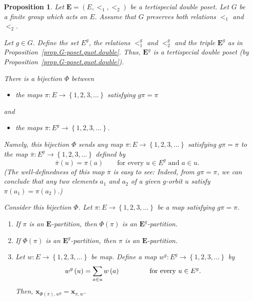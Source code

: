\documentclass[12pt]{article}
\theoremstyle{plain}
\newtheorem{proposition}[theorem]{Proposition}
\theoremstyle{definition}
\theoremstyle{remark}
\let\sumnonlimits\sum
\renewcommand{\sum}{\sumnonlimits\limits}
\newcommand{\xx}{{\mathbf{x}}}
\newcommand{\EE}{{\mathbf{E}}}
\begin{document}
\begin{proposition}
\label{prop.G-poset.quot.Phi}
Let $\EE = \left(E, <_1, <_2\right)$ be a tertispecial double poset.
Let $G$ be a finite group which acts on $E$. Assume that $G$ preserves
both relations $<_1$ and $<_2$.

Let $g \in G$. Define the set $E^g$, the relations $<_1^g$ and $<_2^g$
and the triple $\EE^g$ as in Proposition~\ref{prop.G-poset.quot.double}.
Thus, $\EE^g$ is a tertispecial double poset (by
Proposition~\ref{prop.G-poset.quot.double}).


There is a bijection $\Phi$ between

\begin{itemize}
\item the maps $\pi:E\rightarrow\left\{  1,2,3,\ldots\right\}  $ satisfying
$g\pi=\pi$
\end{itemize}

and

\begin{itemize}
\item the maps $\overline{\pi}:E^{g}\rightarrow\left\{  1,2,3,\ldots\right\}
$.
\end{itemize}

Namely, this bijection $\Phi$ sends any map
$\pi:E\rightarrow\left\{  1,2,3,\ldots \right\}  $ satisfying $g\pi=\pi$
to the map $\overline{\pi}:E^{g}
\rightarrow\left\{  1,2,3,\ldots\right\}  $ defined by
\[
\overline{\pi}\left( u \right)
= \pi\left( a \right)
\qquad\text{for every } u \in E^{g} \text{ and } a \in u.
\]
(The well-definedness of this map $\overline{\pi}$ is easy to see:
Indeed, from $g\pi=\pi$, we can conclude that any two elements
$a_1$ and $a_2$ of a given $g$-orbit $u$ satisfy
$\pi\left(a_1\right) = \pi\left(a_2\right)$.)


Consider this bijection $\Phi$. Let
$\pi:E\rightarrow\left\{  1,2,3,\ldots\right\}  $ be a
map satisfying $g\pi=\pi$.

\begin{enumerate}
\item[(a)] If $\pi$ is an $\EE$-partition, then $\Phi\left(
\pi\right)  $ is an $ \EE ^{g}$-partition.

\item[(b)] If $\Phi\left(  \pi\right)  $ is an
$\EE^{g}$-partition, then $\pi$ is an $\EE$-partition.

\item[(c)] Let $w : E \to \left\{1,2,3,\ldots\right\}$ be
map. Define a map $w^{g}:E^{g}\rightarrow
\left\{1,2,3,\ldots\right\}$
by
\[
w^{g}\left(  u\right)  =\sum\limits_{a\in u}w\left(
a\right)  \qquad \qquad \text{ for every } u \in E^g .
\]
Then, $\xx_{\Phi\left(  \pi\right)  ,w^{g}}
=\xx_{\pi,w}$.

\end{enumerate}
\end{proposition}
\end{document}
